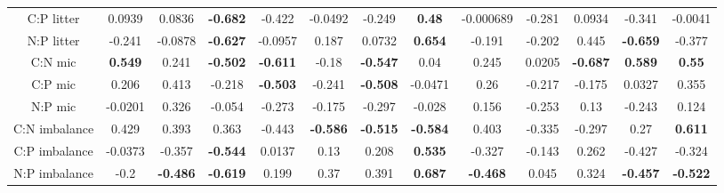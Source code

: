 \documentclass[10pt]{article}
\begin{document}
\begin{landscape}
\begin{table}[h!]
\begin{center}
{\begin{tabular}{ccccccccccccc}
  C:P litter & 0.0939 & 0.0836 & \textbf{ -0.682 } & -0.422 & -0.0492 & -0.249 & \textbf{ 0.48 } & -0.000689 & -0.281 & 0.0934 & -0.341 & -0.0041 \\ 
  N:P litter & -0.241 & -0.0878 & \textbf{ -0.627 } & -0.0957 & 0.187 & 0.0732 & \textbf{ 0.654 } & -0.191 & -0.202 & 0.445 & \textbf{ -0.659 } & -0.377 \\ 
  C:N mic & \textbf{ 0.549 } & 0.241 & \textbf{ -0.502 } & \textbf{ -0.611 } & -0.18 & \textbf{ -0.547 } & 0.04 & 0.245 & 0.0205 & \textbf{ -0.687 } & \textbf{ 0.589 } & \textbf{ 0.55 } \\ 
  C:P mic & 0.206 & 0.413 & -0.218 & \textbf{ -0.503 } & -0.241 & \textbf{ -0.508 } & -0.0471 & 0.26 & -0.217 & -0.175 & 0.0327 & 0.355 \\ 
  N:P mic & -0.0201 & 0.326 & -0.054 & -0.273 & -0.175 & -0.297 & -0.028 & 0.156 & -0.253 & 0.13 & -0.243 & 0.124 \\ 
  C:N imbalance & 0.429 & 0.393 & 0.363 & -0.443 & \textbf{ -0.586 } & \textbf{ -0.515 } & \textbf{ -0.584 } & 0.403 & -0.335 & -0.297 & 0.27 & \textbf{ 0.611 } \\ 
  C:P imbalance & -0.0373 & -0.357 & \textbf{ -0.544 } & 0.0137 & 0.13 & 0.208 & \textbf{ 0.535 } & -0.327 & -0.143 & 0.262 & -0.427 & -0.324 \\ 
  N:P imbalance & -0.2 & \textbf{ -0.486 } & \textbf{ -0.619 } & 0.199 & 0.37 & 0.391 & \textbf{ 0.687 } & \textbf{ -0.468 } & 0.045 & 0.324 & \textbf{ -0.457 } & \textbf{ -0.522 } \\ 
   \hline
\end{tabular}
}
\end{center}
\end{table}\end{landscape}


\end{document}

